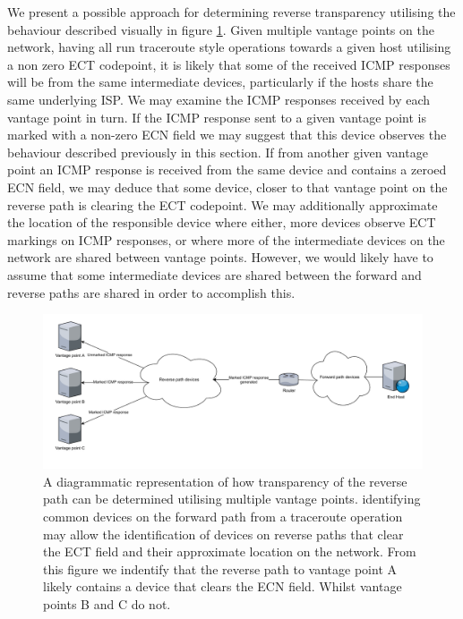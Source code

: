 \documentclass{l4proj}
\begin{document}
We present a possible approach for determining reverse transparency utilising the behaviour described visually in figure \ref{fig:reverse}. Given multiple vantage points on the network, having all run traceroute style operations towards a given host utilising a non zero ECT codepoint, it is likely that some of the received ICMP responses will be from the same intermediate devices, particularly if the hosts share the same underlying ISP. We may examine the ICMP responses received by each vantage point in turn. If the ICMP response sent to a given vantage point is marked with a non-zero ECN field we may suggest that this device observes the behaviour described previously in this section. If from another given vantage point an ICMP response is received from the same device and contains a zeroed ECN field, we may deduce that some device, closer to that vantage point on the reverse path is clearing the ECT codepoint. We may additionally approximate the location of the responsible device where either, more devices observe ECT markings on ICMP responses, or where more of the intermediate devices on the network are shared between vantage points. However, we would likely have to assume that some intermediate devices are shared between the forward and reverse paths are shared in order to accomplish this.

\begin{figure}[H]
    \centering
    \includegraphics[scale=0.5]{dissertation/images/reversepath.pdf}
    \caption{A diagrammatic representation of how transparency of the reverse path can be determined utilising multiple vantage points. identifying common devices on the forward path from a traceroute operation may allow the identification of devices on reverse paths that clear the ECT field and their approximate location on the network. From this figure we indentify that the reverse path to vantage point A likely contains a device that clears the ECN field. Whilst vantage points B and C do not.}
    \label{fig:reverse}
\end{figure}
\end{document}
